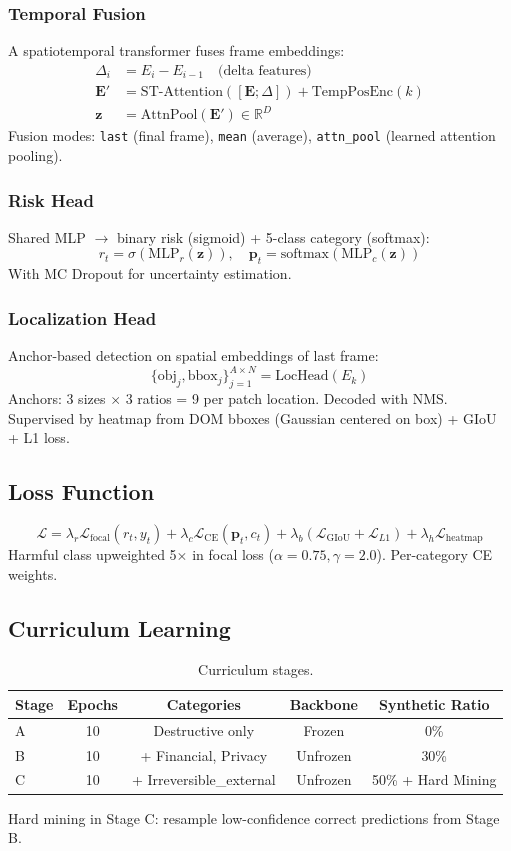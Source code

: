 \documentclass[11pt,a4paper]{article}
\begin{document}
\subsubsection{Temporal Fusion}
A spatiotemporal transformer fuses frame embeddings:
\begin{align*}
    \Delta_i &= E_i - E_{i-1} \quad \text{(delta features)} \\
    \mathbf{E}' &= \text{ST-Attention}([\mathbf{E}; \Delta]) + \text{TempPosEnc}(k) \\
    \mathbf{z} &= \text{AttnPool}(\mathbf{E}') \in \mathbb{R}^D
\end{align*}
Fusion modes: \texttt{last} (final frame), \texttt{mean} (average), \texttt{attn\_pool} (learned attention pooling).

\subsubsection{Risk Head}
Shared MLP $\to$ binary risk (sigmoid) + 5-class category (softmax):
\[
r_t = \sigma(\text{MLP}_r(\mathbf{z})), \quad \mathbf{p}_t = \text{softmax}(\text{MLP}_c(\mathbf{z}))
\]
With MC Dropout for uncertainty estimation.

\subsubsection{Localization Head}
Anchor-based detection on spatial embeddings of last frame:
\[
\{\text{obj}_j, \text{bbox}_j\}_{j=1}^{A \times N} = \text{LocHead}(E_k)
\]
Anchors: 3 sizes $\times$ 3 ratios = 9 per patch location. Decoded with NMS. Supervised by heatmap from DOM bboxes (Gaussian centered on box) + GIoU + L1 loss.

\subsection{Loss Function}
\[
\mathcal{L} = \lambda_r \mathcal{L}_{\text{focal}}(r_t, y_t) + \lambda_c \mathcal{L}_{\text{CE}}(\mathbf{p}_t, c_t) + \lambda_b (\mathcal{L}_{\text{GIoU}} + \mathcal{L}_{L1}) + \lambda_h \mathcal{L}_{\text{heatmap}}
\]
Harmful class upweighted 5$\times$ in focal loss ($\alpha=0.75, \gamma=2.0$). Per-category CE weights.

\subsection{Curriculum Learning}
\begin{table}[H]
\centering
\caption{Curriculum stages.}
\label{tab:curriculum}
\begin{tabular}{lcccc}
\toprule
Stage & Epochs & Categories & Backbone & Synthetic Ratio \\
\midrule
A & 10 & Destructive only & Frozen & 0\% \\
B & 10 & + Financial, Privacy & Unfrozen & 30\% \\
C & 10 & + Irreversible\_external & Unfrozen & 50\% + Hard Mining \\
\bottomrule
\end{tabular}
\end{table}
Hard mining in Stage C: resample low-confidence correct predictions from Stage B.
\end{document}
